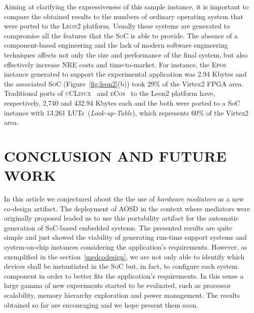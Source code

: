 \documentclass{kapproc} %
\begin{document}
 Aiming at clarifying the expressiveness of this sample instance, it
 is important to compare the obtained results to the numbers of
 ordinary operating system that were ported to the \textsc{Leon2}
 platform. Usually these systems are generated to compromise all the
 features that the \textsc{SoC} is able to provide. The absence of a
 component-based engineering and the lack of modern software
 engineering techniques affects not only the size and performance of
 the final system, but also effectively increase NRE costs and
 time-to-market. For instance, the \textsc{Epos} instance generated to
 support the experimental application was 2.94 Kbytes and the
 associated \textsc{SoC} (Figure~\ref{fig:leon2}(b)) took 29\% of the
 Virtex2 FPGA area. Traditional ports of
 \textsc{uCLinux}~\cite{LeonuClinux:2003} and
 \textsc{eCos}~\cite{Massa:2002} to the Leon2 platform have,
 respectively, 2,740 and 432.94 Kbytes each and the both were ported
 to a SoC instance with 13,261 LUTs~(\emph{Look-up-Table}), which
 represents 60\% of the Virtex2 area.


\section[CONCLUSION AND FUTURE WORK]
{CONCLUSION AND FUTURE WORK}

 In this article we conjectured about the the use of \emph{hardware
 mediators} as a new co-design artifact. The deployment of
 \textsc{AOSD} in the context where mediators were originally proposed
 leaded us to use this portability artifact for the automatic
 generation of SoC-based embedded systems. The presented results are
 quite simple and just showed the viability of generating run-time
 support systems and system-on-chip instances considering the
 application's requirements. However, as exemplified in the
 section~\ref{medcodesign}, we are not only able to identify which
 devices shall be instantiated in the \textsc{SoC} but, in fact, to
 configure each system component in order to better fits the
 application's requirements. In this sense a large gamma of new
 experiments started to be evaluated, such as processor scalability,
 memory hierarchy exploration and power management. The results
 obtained so far are encouraging and we hope present them soon.
 
\end{document}
